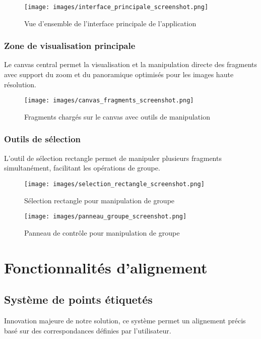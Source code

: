 \documentclass[11pt,a4paper]{report}
\begin{document}
\begin{figure}[htbp]
\centering
\texttt{[image: images/interface\_principale\_screenshot.png]}
\caption{Vue d'ensemble de l'interface principale de l'application}
\end{figure}

\subsubsection{Zone de visualisation principale}

Le canvas central permet la visualisation et la manipulation directe des fragments avec support du zoom et du panoramique optimisés pour les images haute résolution.

\begin{figure}[htbp]
\centering
\texttt{[image: images/canvas\_fragments\_screenshot.png]}
\caption{Fragments chargés sur le canvas avec outils de manipulation}
\end{figure}

\subsubsection{Outils de sélection}

L'outil de sélection rectangle permet de manipuler plusieurs fragments simultanément, facilitant les opérations de groupe.

\begin{figure}[htbp]
\centering
\texttt{[image: images/selection\_rectangle\_screenshot.png]}
\caption{Sélection rectangle pour manipulation de groupe}
\end{figure}

\begin{figure}[htbp]
\centering
\texttt{[image: images/panneau\_groupe\_screenshot.png]}
\caption{Panneau de contrôle pour manipulation de groupe}
\end{figure}

\section{Fonctionnalités d'alignement}

\subsection{Système de points étiquetés}

Innovation majeure de notre solution, ce système permet un alignement précis basé sur des correspondances définies par l'utilisateur.
\end{document}
